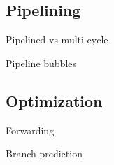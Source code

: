 \subsection{Pipelining}

Pipelined vs multi-cycle

Pipeline bubbles

\subsection{Optimization}

Forwarding

Branch prediction

